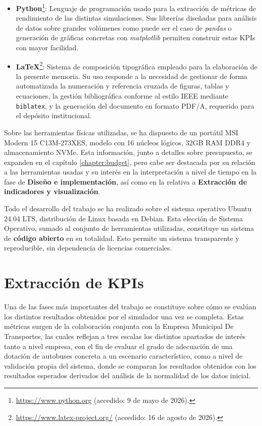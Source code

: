 \begin{itemize}
\item \textbf{Python}\footnote{\url{https://www.python.org} (accedido: 9 de mayo de 2026).}:
Lenguaje de programación usado para la extracción de métricas de rendimiento de las distintas simulaciones. Sus librerías diseñadas para análisis de datos sobre grandes volúmenes como puede ser el caso de \textit{pandas} o generación de gráficas concretas con \textit{matplotlib} permiten construir estas KPIs con mayor facilidad.

\item \textbf{\LaTeX}\footnote{\url{https://www.latex-project.org/} (accedido: 16 de agosto de 2026).}:
Sistema de composición tipográfica empleado para la elaboración de la presente
memoria. Su uso responde a la necesidad de gestionar de forma automatizada la
numeración y referencia cruzada de figuras, tablas y ecuaciones, la gestión
bibliográfica conforme al estilo IEEE mediante \texttt{biblatex}, y la generación
del documento en formato PDF/A, requerido para el depósito institucional.

\end{itemize}

Sobre las herramientas físicas utilizadas, se ha dispuesto de un portátil MSI Modern 15 C13M-273XES, 
modelo con 16 núcleos lógicos, 32GB RAM DDR4 y almacenamiento NVMe. Esta información, junto a detalles sobre presupuesto, 
se expanden en el capítulo \ref{chapter:budget}, pero cabe ser destacada por su relación a las herramientas usadas 
y su interés en la interpretación a nivel de tiempo en la fase de \textbf{Diseño
e implementación}, así como en la relativa a \textbf{Extracción de indicadores y visualización}.

Todo el desarrollo del trabajo se ha realizado sobre el sistema operativo Ubuntu 24.04 LTS, distribución 
de Linux basada en Debian. Esta elección de Sistema Operativo, sumado al conjunto de herramientas utilizadas,
constituye un sistema de \textbf{código abierto} en su totalidad. Esto permite un sistema transparente y reproducible, 
sin dependencia de licencias comerciales.

 \section{Extracción de KPIs}\label{sec:kpi_extraction}
 Una de las fases más importantes del trabajo se constituye sobre cómo se evalúan los distintos resultados obtenidos
 por el simulador una vez se completa. Estas métricas surgen de la colaboración conjunta con la Empresa Municipal De
 Transportes, las cuales reflejan a tres escalas los distintos apartados de interés tanto a nivel empresa, con el fin
 de evaluar el grado de adecuación de una dotación de autobuses concreta a un escenario característico, como a nivel de
 validación propia del sistema, donde se comparan los resultados obtenidos con los resultados esperados derivados del 
 análisis de la normalidad de los datos inicial.

